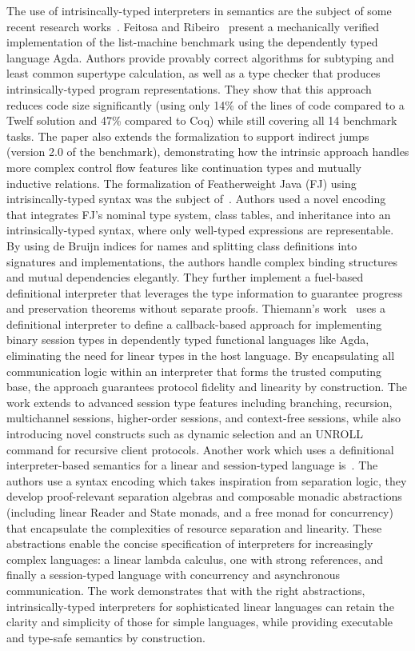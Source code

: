 \documentclass[preprint,12pt]{elsarticle}
\theoremstyle{definition}
\begin{document}
The use of intrisincally-typed interpreters in semantics are the subject of
some recent research works~\cite{Feitosa19, Feitosa22, Thiemann23, Rouvoet20,
Rest22}.
Feitosa and Ribeiro~\cite{Feitosa22} present a mechanically verified
implementation of the list-machine benchmark using the dependently typed language
Agda. Authors provide provably correct algorithms for subtyping and least common
supertype calculation, as well as a type checker that produces intrinsically-typed
program representations. They show that this approach reduces code size significantly
(using only 14\% of the lines of code compared to a Twelf solution and 47\% compared
to Coq) while still covering all 14 benchmark tasks. The paper also extends the
formalization to support indirect jumps (version 2.0 of the benchmark), demonstrating
how the intrinsic approach handles more complex control flow features like continuation
types and mutually inductive relations. The formalization of Featherweight Java (FJ)
using intrisincally-typed syntax was the subject of~\cite{Feitosa19}.
Authors used a novel encoding that integrates FJ's nominal type system, class tables,
and inheritance into an intrinsically-typed syntax, where only well-typed expressions
are representable. By using de Bruijn indices for names and splitting class definitions
into signatures and implementations, the authors handle complex binding structures and
mutual dependencies elegantly. They further implement a fuel-based definitional
interpreter that leverages the type information to guarantee progress and preservation
theorems without separate proofs.
Thiemann's work~\cite{Thiemann23} uses a definitional interpreter to define a callback-based approach for
implementing binary session types in dependently typed functional languages like Agda,
eliminating the need for linear types in the host language. By encapsulating all
communication logic within an interpreter that forms the trusted computing base,
the approach guarantees protocol fidelity and linearity by construction. The work extends
to advanced session type features including branching, recursion, multichannel sessions,
higher-order sessions, and context-free sessions, while also introducing novel constructs
such as dynamic selection and an UNROLL command for recursive client protocols.
Another work which uses a definitional interpreter-based semantics for a linear and session-typed
language is~\cite{Rouvoet20}. The authors use a syntax encoding which takes inspiration from separation
logic, they develop proof-relevant separation algebras and composable
monadic abstractions (including linear Reader and State monads, and a free
monad for concurrency) that encapsulate the complexities of resource
separation and linearity. These abstractions enable the concise specification of
interpreters for increasingly complex languages: a linear lambda calculus,
one with strong references, and finally a session-typed language with
concurrency and asynchronous communication. The work demonstrates that
with the right abstractions, intrinsically-typed interpreters for sophisticated linear
languages can retain the clarity and simplicity of those for simple languages, while
providing executable and type-safe semantics by construction.
\end{document}
